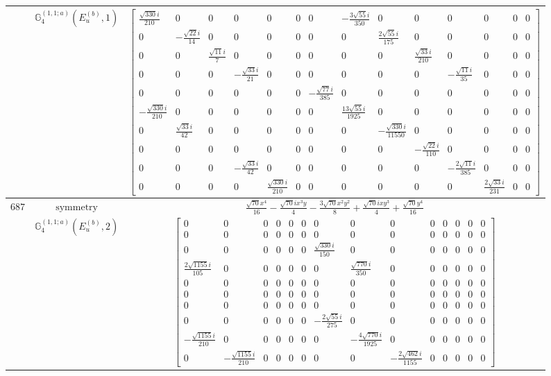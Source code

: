\documentclass[fleqn,8pt,landscape]{jsarticle}
\begin{document}
\begin{longtable}{ccc}
$  $ & $ \mathbb{G}_{4}^{(1,1;a)}(E_{u}^{(b)},1) $ & $ \begin{bmatrix} \frac{\sqrt{330} i}{210} & 0 & 0 & 0 & 0 & 0 & 0 & - \frac{3 \sqrt{55} i}{350} & 0 & 0 & 0 & 0 & 0 & 0 \\ 0 & - \frac{\sqrt{22} i}{14} & 0 & 0 & 0 & 0 & 0 & 0 & \frac{2 \sqrt{55} i}{175} & 0 & 0 & 0 & 0 & 0 \\ 0 & 0 & \frac{\sqrt{11} i}{7} & 0 & 0 & 0 & 0 & 0 & 0 & \frac{\sqrt{33} i}{210} & 0 & 0 & 0 & 0 \\ 0 & 0 & 0 & - \frac{\sqrt{33} i}{21} & 0 & 0 & 0 & 0 & 0 & 0 & - \frac{\sqrt{11} i}{35} & 0 & 0 & 0 \\ 0 & 0 & 0 & 0 & 0 & 0 & - \frac{\sqrt{77} i}{385} & 0 & 0 & 0 & 0 & 0 & 0 & 0 \\ - \frac{\sqrt{330} i}{210} & 0 & 0 & 0 & 0 & 0 & 0 & \frac{13 \sqrt{55} i}{1925} & 0 & 0 & 0 & 0 & 0 & 0 \\ 0 & \frac{\sqrt{33} i}{42} & 0 & 0 & 0 & 0 & 0 & 0 & - \frac{\sqrt{330} i}{11550} & 0 & 0 & 0 & 0 & 0 \\ 0 & 0 & 0 & 0 & 0 & 0 & 0 & 0 & 0 & - \frac{\sqrt{22} i}{110} & 0 & 0 & 0 & 0 \\ 0 & 0 & 0 & - \frac{\sqrt{33} i}{42} & 0 & 0 & 0 & 0 & 0 & 0 & - \frac{2 \sqrt{11} i}{385} & 0 & 0 & 0 \\ 0 & 0 & 0 & 0 & \frac{\sqrt{330} i}{210} & 0 & 0 & 0 & 0 & 0 & 0 & \frac{2 \sqrt{33} i}{231} & 0 & 0 \end{bmatrix} $ \\ \hline
$ 687 $ & $ \text{symmetry} $ & $ \frac{\sqrt{70} x^{4}}{16} - \frac{\sqrt{70} i x^{3} y}{4} - \frac{3 \sqrt{70} x^{2} y^{2}}{8} + \frac{\sqrt{70} i x y^{3}}{4} + \frac{\sqrt{70} y^{4}}{16} $ \\
$  $ & $ \mathbb{G}_{4}^{(1,1;a)}(E_{u}^{(b)},2) $ & $ \begin{bmatrix} 0 & 0 & 0 & 0 & 0 & 0 & 0 & 0 & 0 & 0 & 0 & 0 & 0 & 0 \\ 0 & 0 & 0 & 0 & 0 & 0 & 0 & 0 & 0 & 0 & 0 & 0 & 0 & 0 \\ 0 & 0 & 0 & 0 & 0 & 0 & \frac{\sqrt{330} i}{150} & 0 & 0 & 0 & 0 & 0 & 0 & 0 \\ \frac{2 \sqrt{1155} i}{105} & 0 & 0 & 0 & 0 & 0 & 0 & \frac{\sqrt{770} i}{350} & 0 & 0 & 0 & 0 & 0 & 0 \\ 0 & 0 & 0 & 0 & 0 & 0 & 0 & 0 & 0 & 0 & 0 & 0 & 0 & 0 \\ 0 & 0 & 0 & 0 & 0 & 0 & 0 & 0 & 0 & 0 & 0 & 0 & 0 & 0 \\ 0 & 0 & 0 & 0 & 0 & 0 & 0 & 0 & 0 & 0 & 0 & 0 & 0 & 0 \\ 0 & 0 & 0 & 0 & 0 & 0 & - \frac{2 \sqrt{55} i}{275} & 0 & 0 & 0 & 0 & 0 & 0 & 0 \\ - \frac{\sqrt{1155} i}{210} & 0 & 0 & 0 & 0 & 0 & 0 & - \frac{4 \sqrt{770} i}{1925} & 0 & 0 & 0 & 0 & 0 & 0 \\ 0 & - \frac{\sqrt{1155} i}{210} & 0 & 0 & 0 & 0 & 0 & 0 & - \frac{2 \sqrt{462} i}{1155} & 0 & 0 & 0 & 0 & 0 \end{bmatrix} $ \\ \hline

\end{longtable}
\end{document}
